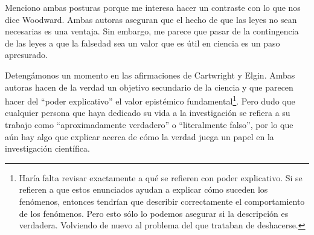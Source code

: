 Menciono ambas posturas porque me interesa hacer un contraste con lo que nos dice Woodward. Ambas autoras aseguran que el hecho de que las leyes no sean necesarias es una ventaja. Sin embargo, me parece que pasar de la contingencia de las leyes a que la falsedad sea un valor que es útil en ciencia es un paso apresurado.


Detengámonos un momento en las afirmaciones de Cartwright y Elgin. Ambas autoras hacen de la verdad un objetivo secundario de la ciencia y que parecen hacer del ``poder explicativo'' el valor epistémico fundamental\footnote{Haría falta revisar exactamente a qué se refieren con poder explicativo. Si se refieren a que estos enunciados ayudan a explicar cómo suceden los fenómenos, entonces tendrían que describir correctamente el comportamiento de los fenómenos. Pero esto sólo lo podemos asegurar si la descripción es verdadera. Volviendo de nuevo al problema del que trataban de deshacerse.}. Pero dudo que cualquier persona que haya dedicado su vida a la investigación se refiera a su trabajo como ``aproximadamente verdadero'' o ``literalmente falso'', por lo que aún hay algo que explicar acerca de cómo la verdad juega un papel en la investigación científica.


